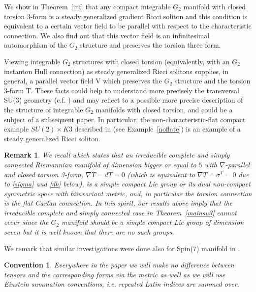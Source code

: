 \documentclass[10pt,british]{article}
\newtheorem{rmrk}[thrm]{Remark}
\newtheorem{conv}[thrm]{Convention}
\def\sb {{\nabla}}
\begin{document}
We show in Theorem~\ref{inf} that any compact integrable $G_2$ manifold with closed torsion 3-form is a steady generalized gradient Ricci soliton  and this condition is equivalent to a certain vector field to be parallel with respect to the characteristic connection. We also find out that this  vector field  is an infinitesimal automorphism of the $G_2$  structure  and preserves the torsion three form. 

Viewing integrable $G_2$ structures with closed torsion (equivalently, with an $G_2$ instanton Hull connection) as steady generalized Ricci solitons supplies, in general, a parallel vector field V which preserves the $G_2$ structure and the torsion 3-form T. These facts could help to understand more precisely the transversal SU(3) geometry (c.f. \cite{OLM})  %
and  may reflect to a possible more precise description of the structure of integrable $G_2$ manifolds with closed  torsion, and could be a subject of a subsequent paper. In particular, the non-characteristic-flat compact example $SU(2)\times K3$ described in \cite{PP,FF} (see Example~\ref{noflate}) is an example of a steady generalized Ricci soliton.






\begin{rmrk} We recall \cite[Theorem~4.1]{AFF} which states that an irreducible complete and simply connected Riemannian manifold of dimension bigger or equal to $5$ with $\sb$-parallel and closed torsion 3-form, $\sb T=dT=0$ (which is equivalent to $\sb T=\sigma^T=0$ due to \eqref{sigma} and \eqref{dh}  below), is a simple compact Lie group or its dual non-compact symmetric space with biinvariant metric, and, in particular the torsion connection is the flat Cartan connection. In this spirit, our results above imply that  the irreducible complete and simply connected case in Theorem~\ref{mainsu3} cannot occur since the $G_2$ manifold should be a simple  compact Lie group of dimension seven but it is well known that there are no such groups. 
\end{rmrk}
We remark that similar investigations were done also for Spin(7) manifold in \cite{IP}.
\begin{conv}
Everywhere in the paper we will make no difference between tensors and the corresponding forms via the metric as well as we will  use Einstein summation conventions, i.e. repeated Latin  indices are summed over.

\end{conv}
\end{document}
